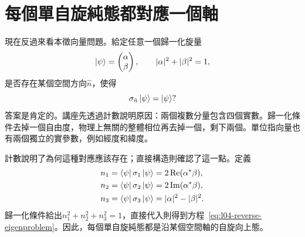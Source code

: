 \section{每個單自旋純態都對應一個軸}

現在反過來看本徵向量問題。給定任意一個歸一化旋量
\begin{equation}
  \left\lvert\psi\right\rangle=
  \begin{pmatrix}\alpha\\\beta\end{pmatrix},
  \qquad
  |\alpha|^2+|\beta|^2=1,
  \label{eq:l04-general-spinor}
\end{equation}
是否存在某個空間方向\(\hat n\)，使得
\begin{equation}
  \sigma_{\hat n}\left\lvert\psi\right\rangle=\left\lvert\psi\right\rangle?
  \label{eq:l04-reverse-eigenproblem}
\end{equation}
答案是肯定的。講座先透過計數說明原因：兩個複數分量包含四個實數。歸一化條件去掉一個自由度，物理上無關的整體相位再去掉一個，剩下兩個。單位指向量也有兩個獨立的實參數，例如經度和緯度。

\begin{classroomqa}
\end{classroomqa}

\begin{classroomqa}
\end{classroomqa}

計數說明了為何這種對應應該存在；直接構造則確認了這一點。定義
\begin{align}
  n_1&=\left\langle\psi\right\rvert\sigma_1\left\lvert\psi\right\rangle
      =2\operatorname{Re}(\alpha^*\beta),
  \notag\\
  n_2&=\left\langle\psi\right\rvert\sigma_2\left\lvert\psi\right\rangle
      =2\operatorname{Im}(\alpha^*\beta),
  \notag\\
  n_3&=\left\langle\psi\right\rvert\sigma_3\left\lvert\psi\right\rangle
      =|\alpha|^2-|\beta|^2.
  \label{eq:l04-bloch-components}
\end{align}
歸一化條件給出\(n_1^2+n_2^2+n_3^2=1\)，直接代入則得到方程~\eqref{eq:l04-reverse-eigenproblem}。因此，每個單自旋純態都是沿某個空間軸的自旋向上態。

